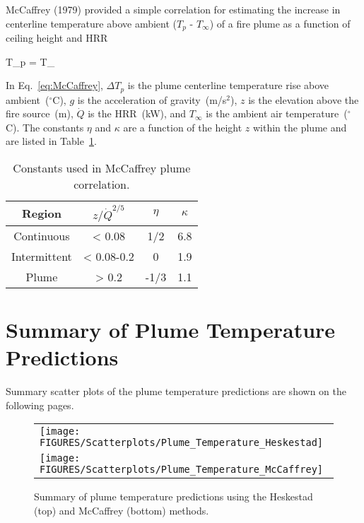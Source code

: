 McCaffrey (1979) provided a simple correlation for estimating the increase in centerline temperature above ambient ($T_p$ - $T_\infty$) of a fire plume as a function of ceiling height and HRR

\be
\Delta T_p =  T_\infty
\label{eq:McCaffrey}
\ee

In Eq.~\ref{eq:McCaffrey}, $\Delta T_p$ is the plume centerline temperature rise above ambient~($^\circ$C), $g$ is the acceleration of gravity~(m/s$^2$), $z$ is the elevation above the fire source~(m), $\dot Q$ is the HRR~(kW), and $T_\infty$ is the ambient air temperature~($^\circ$C). The constants $\eta$ and $\kappa$ are a function of the height $z$ within the plume and are listed in Table~\ref{tbl:McCaffrey_constants}.

\vspace{\baselineskip}
\begin{table}[ht]
\begin{center}
\caption[Constants used in McCaffrey plume correlation]
{Constants used in McCaffrey plume correlation.}
\label{tbl:McCaffrey_constants}
\begin{tabular}{|c|c|c|c|}
\hline
Region  &  $z/\dot Q^{2/5}$  &  $\eta$  &  $\kappa$  \\
\hline
Continuous    &  < 0.08      & 1/2   & 6.8  \\
Intermittent  &  < 0.08-0.2  & 0     & 1.9  \\
Plume         &  > 0.2       & -1/3  & 1.1  \\
\hline
\end{tabular}
\end{center}
\end{table}


\clearpage


\section{Summary of Plume Temperature Predictions}

Summary scatter plots of the plume temperature predictions are shown on the following pages.


\begin{figure}[ht]
\begin{center}
\begin{tabular}{l}
\texttt{[image: FIGURES/Scatterplots/Plume\_Temperature\_Heskestad]} \\
\texttt{[image: FIGURES/Scatterplots/Plume\_Temperature\_McCaffrey]}
\end{tabular}
\end{center}
\caption[Summary of plume temperature predictions]
{Summary of plume temperature predictions using the Heskestad (top) and McCaffrey (bottom) methods.}
\label{Plume_Temperature_Summary}
\end{figure}
